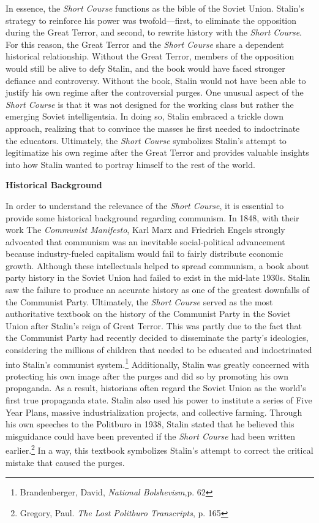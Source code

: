 \documentclass[a4paper, twocolumn]{article}
\begin{document}
In essence, the \emph{Short Course} functions as the bible of the
Soviet Union. Stalin's strategy to reinforce his power was
twofold—first, to eliminate the opposition during the Great
Terror, and second, to rewrite history with the \emph{Short
  Course}. For this reason, the Great Terror and the \emph{Short
  Course} share a dependent historical relationship. Without the
Great Terror, members of the opposition would still be alive
to defy Stalin, and the book would have faced stronger
defiance and controversy. Without the book, Stalin would not
have been able to justify his own regime after the
controversial purges. One unusual aspect of the \emph{Short Course}
is that it was not designed for the working class but rather
the emerging Soviet intelligentsia. In doing so, Stalin
embraced a trickle down approach, realizing that to convince
the masses he first needed to indoctrinate the
educators. Ultimately, the \emph{Short Course} symbolizes Stalin's
attempt to legitimatize his own regime after the Great Terror
and provides valuable insights into how Stalin wanted to
portray himself to the rest of the world.


\begin{center}\textbf{Historical Background}\end{center}

In order to understand the relevance of the \emph{Short Course}, it is
essential to provide some historical background regarding
communism. In 1848, with their work The \emph{Communist Manifesto}, Karl Marx
and Friedrich Engels strongly advocated that communism was an
inevitable social-political advancement because industry-fueled
capitalism would fail to fairly distribute economic growth. Although
these intellectuals helped to spread communism, a book about party history in the
Soviet Union had failed to exist in the mid-late 1930s. Stalin saw the
failure to produce an accurate history as one of the greatest
downfalls of the Communist Party. Ultimately, the \emph{Short Course} served
as the most authoritative textbook on the history of the Communist
Party in the Soviet Union after Stalin's reign of Great Terror. This
was partly due to the fact that the Communist Party had recently
decided to disseminate the party's ideologies, considering the
millions of children that needed to be educated and indoctrinated into
Stalin’s communist system.\footnote{Brandenberger, David, \emph{National Bolshevism},p. 62} Additionally, Stalin was greatly
concerned with protecting his own image after the purges and did so by
promoting his own propaganda. As a result, historians often regard the
Soviet Union as the world's first true propaganda state. Stalin also
used his power to institute a series of Five Year Plans, massive
industrialization projects, and collective farming. Through his own
speeches to the Politburo in 1938, Stalin stated that he believed this
misguidance could have been prevented if the \emph{Short Course} had been
written earlier.\footnote{Gregory, Paul. \emph{The Lost Politburo Transcripts}, p. 165} In a way, this textbook symbolizes Stalin's
attempt to correct the critical mistake that caused the purges.
\end{document}
